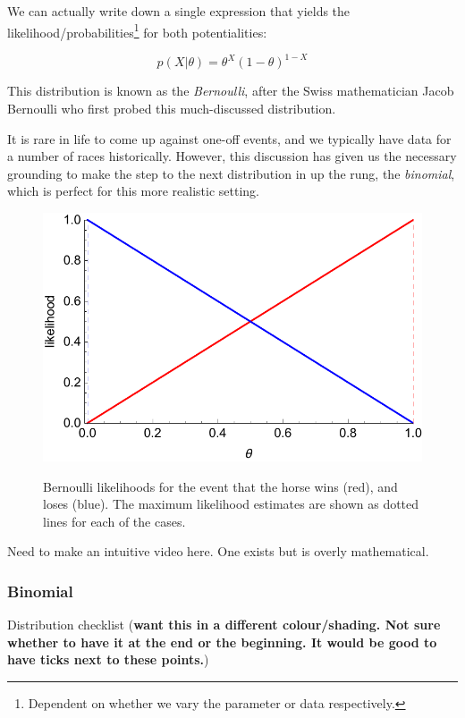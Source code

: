 \documentclass[11pt,fullpage]{book}
\begin{document}
We can actually write down a single expression that yields the likelihood/probabilities\footnote{Dependent on whether we vary the parameter or data respectively.} for both potentialities:

\begin{equation}\label{eq:Distributions_binomialDefinition}
p(X|\theta) = \theta^X (1-\theta)^{1-X}
\end{equation}

This distribution is known as the \textit{Bernoulli}, after the Swiss mathematician Jacob Bernoulli who first probed this much-discussed distribution.

It is rare in life to come up against one-off events, and we typically have data for a number of races historically.  However, this discussion has given us the necessary grounding to make the step to the next distribution in up the rung, the \textit{binomial}, which is perfect for this more realistic setting.

\begin{figure}
\centering
\scalebox{0.5} 
{\includegraphics{Distributions_bernoulliHorseRace.pdf}}
\caption{Bernoulli likelihoods for the event that the horse wins (red), and loses (blue). The maximum likelihood estimates are shown as dotted lines for each of the cases.}\label{fig:Distributions_bernoulliHorseRace}
\end{figure}

 Need to make an intuitive video here. One exists but is overly mathematical.

\subsubsection{Binomial}
Distribution checklist (\textbf{want this in a different colour/shading. Not sure whether to have it at the end or the beginning. It would be good to have ticks next to these points.})
\end{document}
